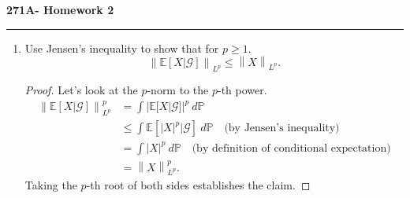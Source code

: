 \documentclass[11pt,letterpaper]{report}
\newcommand{\mcal}[1]{\mathcal{#1}}
\newcommand{\Lp}[2]{\left\|{#1}\right\|_{L^{#2}}}
\newcommand{\E}{\mathbb{E}}
\newcommand{\prob}{\mathbb{P}}
\begin{document}
\begin{center}
{\bf \Large 271A- Homework 2} %
\vspace{0.2cm}
\hrule
\end{center}

\begin{enumerate}
	\item Use Jensen's inequality to show that for $p\geq 1$.
	\[
	\Lp{\E[X|\mcal{G}]}{p} \leq \Lp{X}{p}.
	\]
	\begin{proof}
		Let's look at the $p$-norm to the $p$-th power.
		\begin{align*}
			\Lp{\E[X|\mcal{G}]}{p}^p &= \int |\E[X|\mcal{G}]|^p\ d\prob\\
			&\leq \int\E[|X|^p|\mcal{G}]\ d\prob\quad\text{(by Jensen's inequality)}\\
			&= \int |X|^p\ d\prob\quad\text{(by definition of conditional expectation)}\\
			&= \Lp{X}{p}^p.
		\end{align*}
		Taking the $p$-th root of both sides establishes the claim.
	\end{proof}


\end{enumerate}
\end{document}
